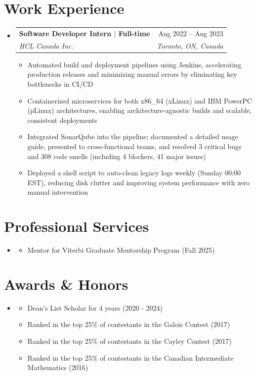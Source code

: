 \documentclass[letterpaper,11pt]{article}
\newcommand{\resumeItem}[1]{
  \item\small{
    {#1 \vspace{-2pt}}
  }
}
\newcommand{\resumeSubheading}[4]{
  \vspace{-2pt}\item
    \begin{tabularx}{\textwidth}[t]{X r}
      \textbf{#1} & #2 \\
      \textit{\small#3} & \textit{\small #4} \\
    \end{tabularx}\vspace{-7pt}
}
\newcommand{\resumeProjectHeading}[2]{
    \item
    \begin{tabularx}{\textwidth}[t]{X r}
        \textbf{#1} & #2 \\
    \end{tabularx}\vspace{-7pt}
}
\newcommand{\resumeSubHeadingListStart}{\begin{itemize}[leftmargin=0in, label={}]}
\newcommand{\resumeSubHeadingListEnd}{\end{itemize}}
\newcommand{\resumeItemListStart}{\begin{itemize}}
\newcommand{\resumeItemListEnd}{\end{itemize}\vspace{-5pt}}
\begin{document}
    

\section{Work Experience}
	\resumeSubHeadingListStart
    \resumeSubheading
    {Software Developer Intern $|$ \normalfont Full-time}{Aug 2022 – Aug 2023}
    {HCL Canada Inc.}{Toronto, ON, Canada}
    \resumeItemListStart
      \resumeItem{Automated build and deployment pipelines using Jenkins, accelerating production releases and minimizing manual errors by eliminating key bottlenecks in CI/CD}
      \resumeItem{Containerized microservices for both x86\_64 (xLinux) and IBM PowerPC (pLinux) architectures, enabling architecture-agnostic builds and scalable, consistent deployments}
      \resumeItem{Integrated SonarQube into the pipeline; documented a detailed usage guide, presented to cross-functional teams, and resolved 3 critical bugs and 308 code smells (including 4 blockers, 41 major issues)}
      \resumeItem{Deployed a shell script to auto-clean legacy logs weekly (Sunday 00:00 EST), reducing disk clutter and improving system performance with zero manual intervention}
    \resumeItemListEnd
  \resumeSubHeadingListEnd

\section{Professional Services}
\resumeSubHeadingListStart
  \item
  \resumeItemListStart
    \resumeItem{Mentor for Viterbi Graduate Mentorship Program (Fall 2025)}
  \resumeItemListEnd
\resumeSubHeadingListEnd

\section{Awards \& Honors}
\resumeSubHeadingListStart
  \item
  \resumeItemListStart
    \resumeItem{Dean's List Scholar for 4 years (2020 - 2024)}
    \resumeItem{Ranked in the top 25\% of contestants in the Galois Contest (2017)}
    \resumeItem{Ranked in the top 25\% of contestants in the Cayley Contest (2017)}
    \resumeItem{Ranked in the top 25\% of contestants in the Canadian Intermediate Mathematics (2016)}
  \resumeItemListEnd
\resumeSubHeadingListEnd
\end{document}
